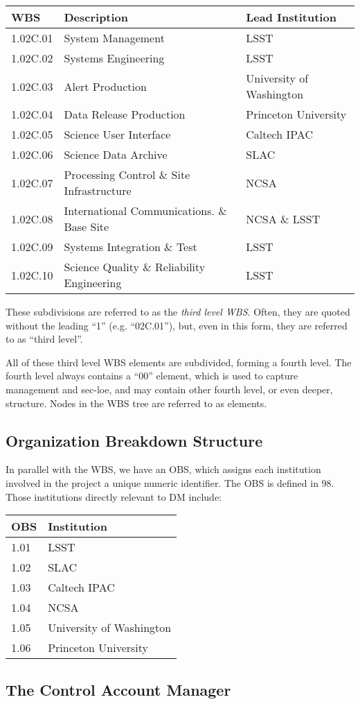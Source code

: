 \begin{longtable}[]{@{}lll@{}}
\hline
WBS & Description & Lead Institution\tabularnewline
\hline
\endhead
1.02C.01 & System Management & LSST\tabularnewline
1.02C.02 & Systems Engineering & LSST\tabularnewline
1.02C.03 & Alert Production & University of Washington\tabularnewline
1.02C.04 & Data Release Production & Princeton University\tabularnewline
1.02C.05 & Science User Interface & Caltech IPAC\tabularnewline
1.02C.06 & Science Data Archive & SLAC\tabularnewline
1.02C.07 & Processing Control \& Site Infrastructure &
NCSA\tabularnewline
1.02C.08 & International Communications. \& Base Site & NCSA \&
LSST\tabularnewline
1.02C.09 & Systems Integration \& Test & LSST\tabularnewline
1.02C.10 & Science Quality \& Reliability Engineering &
LSST\tabularnewline
\hline
\end{longtable}

These subdivisions are referred to as the \emph{third level WBS}. Often,
they are quoted without the leading ``1'' (e.g. ``02C.01''), but, even
in this form, they are referred to as ``third level''.

All of these third level WBS elements are subdivided, forming a fourth
level. The fourth level always contains a ``00'' element, which is used
to capture management and sec-loe, and may contain other fourth level,
or even deeper, structure. Nodes in the WBS tree are referred to as
elements.

\subsection{Organization Breakdown
Structure}\label{organization-breakdown-structure}

In parallel with the WBS, we have an OBS, which assigns each institution
involved in the project a unique numeric identifier. The OBS is defined
in 98. Those institutions directly relevant to DM include:

\begin{longtable}[]{@{}ll@{}}
\hline
OBS & Institution\tabularnewline
\hline
\endhead
1.01 & LSST\tabularnewline
1.02 & SLAC\tabularnewline
1.03 & Caltech IPAC\tabularnewline
1.04 & NCSA\tabularnewline
1.05 & University of Washington\tabularnewline
1.06 & Princeton University\tabularnewline
\hline
\end{longtable}

\subsection{The Control Account
Manager}\label{the-control-account-manager}

